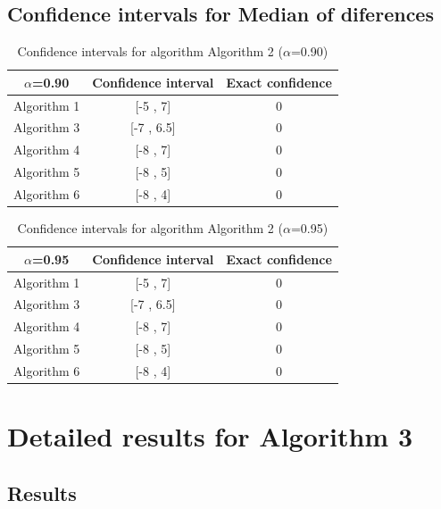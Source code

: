 \documentclass[a4paper,10pt]{article}
\begin{document}
\subsection{Confidence intervals for Median of diferences}

\begin{table}[!htp]
\centering\small
\begin{tabular}{
|c|c|c|}
\hline
 $\alpha$=0.90 & Confidence interval & Exact confidence \\ \hline 
Algorithm 1 & [-5 , 7] & 0\\ \hline 
Algorithm 3 & [-7 , 6.5] & 0\\ \hline 
Algorithm 4 & [-8 , 7] & 0\\ \hline 
Algorithm 5 & [-8 , 5] & 0\\ \hline 
Algorithm 6 & [-8 , 4] & 0\\ \hline 

\end{tabular}
\caption{Confidence intervals for algorithm Algorithm 2 ($\alpha$=0.90)}
\end{table}
\begin{table}[!htp]
\centering\small
\begin{tabular}{
|c|c|c|}
\hline
 $\alpha$=0.95 & Confidence interval & Exact confidence \\ \hline 
Algorithm 1 & [-5 , 7] & 0\\ \hline 
Algorithm 3 & [-7 , 6.5] & 0\\ \hline 
Algorithm 4 & [-8 , 7] & 0\\ \hline 
Algorithm 5 & [-8 , 5] & 0\\ \hline 
Algorithm 6 & [-8 , 4] & 0\\ \hline 

\end{tabular}
\caption{Confidence intervals for algorithm Algorithm 2 ($\alpha$=0.95)}
\end{table}

 \clearpage 


\section{Detailed results for Algorithm 3}


\subsection{Results}
\end{document}
